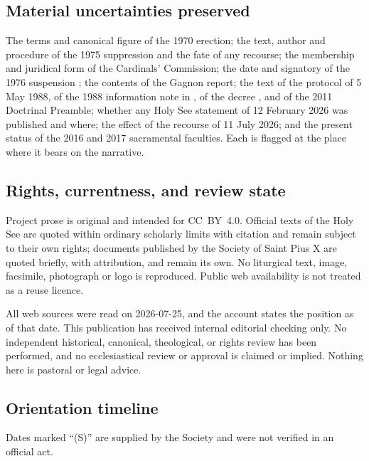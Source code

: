 \subsection{Material uncertainties preserved}

The terms and canonical figure of the 1970 erection; the text, author and
procedure of the 1975 suppression and the fate of any recourse; the
membership and juridical form of the Cardinals' Commission; the date and
signatory of the 1976 suspension ; the contents of the
Gagnon report; the text of the protocol of 5 May 1988, of the 1988
information note in , of the decree
, and of the 2011 Doctrinal Preamble;
whether any Holy See statement of 12 February 2026 was published and
where; the effect of the recourse of 11 July 2026; and the present status
of the 2016 and 2017 sacramental faculties. Each is flagged at the place
where it bears on the narrative.

\subsection{Rights, currentness, and review state}

Project prose is original and intended for CC~BY~4.0. Official texts of
the Holy See are quoted within ordinary scholarly limits with citation
and remain subject to their own rights; documents published by the
Society of Saint Pius X are quoted briefly, with attribution, and remain
its own. No liturgical text, image, facsimile, photograph or logo is
reproduced. Public web availability is not treated as a reuse licence.

All web sources were read on 2026-07-25, and the account states the
position as of that date. This publication has received internal
editorial checking only. No independent historical, canonical,
theological, or rights review has been performed, and no ecclesiastical
review or approval is claimed or implied. Nothing here is pastoral or
legal advice.

\subsection{Orientation timeline}

Dates marked ``(S)'' are supplied by the Society and were not verified in
an official act.

